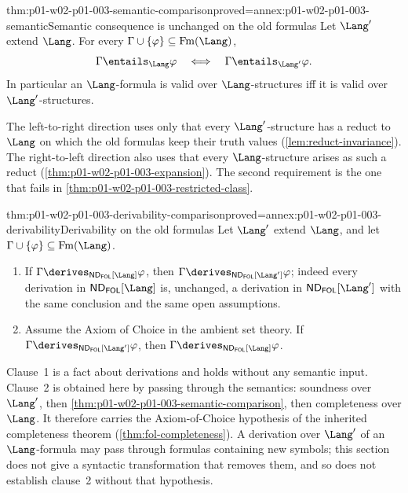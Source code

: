 \begin{hbtheorem}{thm:p01-w02-p01-003-semantic-comparison}{proved=annex:p01-w02-p01-003-semantic}{Semantic consequence is unchanged on the old formulas}
Let \(\Lang'\) extend \(\Lang\). For every
\(\Gamma\cup\{\varphi\}\subseteq\operatorname{Fm}(\Lang)\),
\[
 \Gamma\entails_{\Lang}\varphi
 \quad\Longleftrightarrow\quad
 \Gamma\entails_{\Lang'}\varphi .
\]
In particular an \(\Lang\)-formula is valid over \(\Lang\)-structures iff
it is valid over \(\Lang'\)-structures.
\end{hbtheorem}

The left-to-right direction uses only that every \(\Lang'\)-structure has a
reduct to \(\Lang\) on which the old formulas keep their truth values
(\cref{lem:reduct-invariance}). The right-to-left direction also uses that
every \(\Lang\)-structure arises as such a reduct
(\cref{thm:p01-w02-p01-003-expansion}). The second requirement is the one that
fails in \cref{thm:p01-w02-p01-003-restricted-class}.

\begin{hbtheorem}{thm:p01-w02-p01-003-derivability-comparison}{proved=annex:p01-w02-p01-003-derivability}{Derivability on the old formulas}
Let \(\Lang'\) extend \(\Lang\), and let
\(\Gamma\cup\{\varphi\}\subseteq\operatorname{Fm}(\Lang)\).
\begin{enumerate}
  \item If \(\Gamma\derives_{\mathsf{ND}_{\mathsf{FOL}}[\Lang]}\varphi\),
        then \(\Gamma\derives_{\mathsf{ND}_{\mathsf{FOL}}[\Lang']}\varphi\);
        indeed every derivation in \(\mathsf{ND}_{\mathsf{FOL}}[\Lang]\) is,
        unchanged, a derivation in \(\mathsf{ND}_{\mathsf{FOL}}[\Lang']\)
        with the same conclusion and the same open assumptions.
  \item Assume the Axiom of Choice in the ambient set theory. If
        \(\Gamma\derives_{\mathsf{ND}_{\mathsf{FOL}}[\Lang']}\varphi\), then
        \(\Gamma\derives_{\mathsf{ND}_{\mathsf{FOL}}[\Lang]}\varphi\).
\end{enumerate}
\end{hbtheorem}

Clause~1 is a fact about derivations and holds without any semantic
input. Clause~2 is obtained here by passing through the semantics: soundness
over \(\Lang'\), then \cref{thm:p01-w02-p01-003-semantic-comparison}, then
completeness over \(\Lang\). It therefore carries the Axiom-of-Choice
hypothesis of the inherited completeness theorem
(\cref{thm:fol-completeness}). A derivation over \(\Lang'\) of an
\(\Lang\)-formula may pass through formulas containing new symbols; this
section does not give a syntactic transformation that removes them, and so
does not establish clause~2 without that hypothesis.

